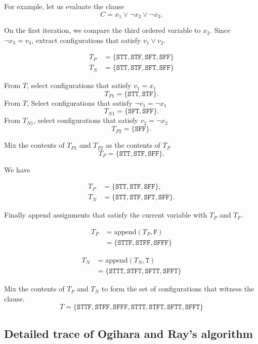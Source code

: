 For example, let us evaluate the clause
\[
C = x_1 \vee \neg x_2 \vee \neg x_3.
\]

On the first iteration, we compare the third ordered variable to $x_3$.  Since $\neg x_3 = v_3$, extract configurations that satisfy $v_1 \vee v_2$.  

\begin{align*}
T_P &= \{ \texttt{STT}, \texttt{STF}, \texttt{SFT}, \texttt{SFF}\} \\
T_N &= \{ \texttt{STT}, \texttt{STF}, \texttt{SFT}, \texttt{SFF}\} 
\end{align*}

\noindent From $T$, select configurations that satisfy $v_1 = x_1$
\[
T_{P1} = \{ \texttt{STT}, \texttt{STF} \}.
\]
\noindent From $T$, Select configurations that satisfy $\neg v_1 = \neg x_1$
\[
T_{N1} = \{ \texttt{SFT}, \texttt{SFF} \}.
\]
\noindent From $T_{N1}$, select configurations that satisfy $v_2 = \neg x_2$
\[
T_{P2} = \{ \texttt{SFF} \}.
\]

\noindent Mix the contents of $T_{P1}$ and $T_{P2}$ as the contents of $T_P$
\[
T_P = \{ \texttt{STT}, \texttt{STF}, \texttt{SFF} \}.
\]

\noindent We have 

\begin{align*}
T_P &= \{ \texttt{STT}, \texttt{STF}, \texttt{SFF} \}, \\
T_N &= \{ \texttt{STT}, \texttt{STF}, \texttt{SFT}, \texttt{SFF}\}.
\end{align*}


Finally append assignments that satisfy the current variable with $T_P$ and $T_F$.

\begin{align*}
T_P &= \text{append}(T_P, \texttt{F}) \\
	&= \{ \texttt{STTF}, \texttt{STFF}, \texttt{SFFF} \}
\end{align*}

\begin{align*}
T_N &= \text{append}(T_N, \texttt{T}) \\
	&= \{ \texttt{STTT}, \texttt{STFT}, \texttt{SFTT}, \texttt{SFFT}\}
\end{align*}


\noindent Mix the contents of $T_P$ and $T_N$ to form the set of configurations that witness the clause. 
\[
T = \{ \texttt{STTF}, \texttt{STFF}, \texttt{SFFF},  \texttt{STTT}, \texttt{STFT}, \texttt{SFTT}, \texttt{SFFT}\}
\]
		
	\subsection{Detailed trace of Ogihara and Ray's algorithm}
	
